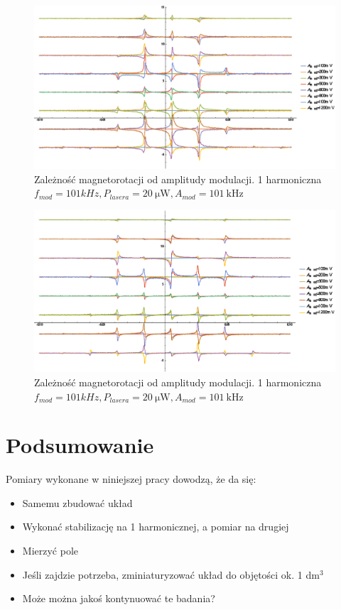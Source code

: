 \documentclass[a4paper,10pt,twoside]{report}
\begin{document}
\begin{figure}[h!]
\centering
 \includegraphics[width=\textwidth]{panoramy_1H_odam.eps}
 \caption{Zależność magnetorotacji od amplitudy modulacji. 1 harmoniczna $f_{mod}=101kHz,P_{lasera}=20~\mathrm{ \mu W}, A_{mod}=101~\mathrm{kHz}$}
 \label{fig:panodam1}
\end{figure}

\begin{figure}[h!]
\centering
 \includegraphics[width=\textwidth]{panoramy_2H_odam.eps}
 \caption{Zależność magnetorotacji od amplitudy modulacji. 1 harmoniczna $f_{mod}=101kHz,P_{lasera}=20~\mathrm{ \mu W}, A_{mod}=101~\mathrm{kHz}$}
 \label{fig:panodam2}
\end{figure}



\chapter{Podsumowanie}

Pomiary wykonane w niniejszej pracy dowodzą, że da się:
\begin{itemize}
\item Samemu zbudować układ
\item Wykonać stabilizację na 1 harmonicznej, a pomiar na drugiej
\item Mierzyć pole
\item Jeśli zajdzie potrzeba, zminiaturyzować układ do objętości ok. 1 dm${}^3$
\item Może można jakoś kontynuować te badania?
\end{itemize}
\end{document}
